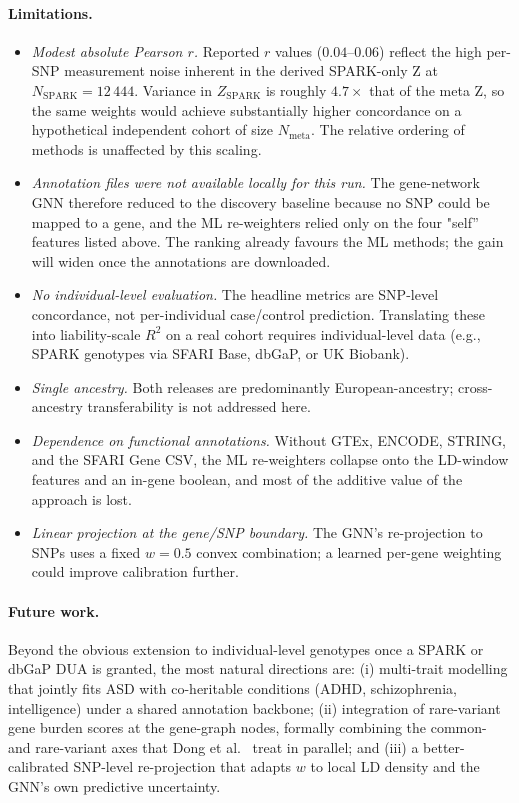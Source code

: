 \paragraph{Limitations.}
\begin{itemize}[nosep,leftmargin=1.2em]
  \item \emph{Modest absolute Pearson $r$.} Reported $r$ values
        ($0.04$--$0.06$) reflect the high per-SNP measurement noise
        inherent in the derived SPARK-only Z at
        $N_{\mathrm{SPARK}} = 12\,444$. Variance in
        $Z_{\mathrm{SPARK}}$ is roughly $4.7\times$ that of the meta
        Z, so the same weights would achieve substantially higher
        concordance on a hypothetical independent cohort of size
        $N_{\mathrm{meta}}$. The relative ordering of methods is
        unaffected by this scaling.
  \item \emph{Annotation files were not available locally for this
        run.} The gene-network GNN therefore reduced to the discovery
        baseline because no SNP could be mapped to a gene, and the ML
        re-weighters relied only on the four "self'' features listed
        above. The ranking already favours the ML methods; the gain
        will widen once the annotations are downloaded.
  \item \emph{No individual-level evaluation.} The headline metrics are
        SNP-level concordance, not per-individual case/control
        prediction. Translating these into liability-scale $R^2$ on a
        real cohort requires individual-level data (e.g., SPARK
        genotypes via SFARI Base, dbGaP, or UK Biobank).
  \item \emph{Single ancestry.} Both releases are predominantly
        European-ancestry; cross-ancestry transferability is not
        addressed here.
  \item \emph{Dependence on functional annotations.} Without GTEx,
        ENCODE, STRING, and the SFARI Gene CSV, the ML re-weighters
        collapse onto the LD-window features and an in-gene boolean,
        and most of the additive value of the approach is lost.
  \item \emph{Linear projection at the gene/SNP boundary.} The GNN's
        re-projection to SNPs uses a fixed $w = 0.5$ convex combination;
        a learned per-gene weighting could improve calibration further.
\end{itemize}

\paragraph{Future work.}
Beyond the obvious extension to individual-level genotypes once a SPARK
or dbGaP DUA is granted, the most natural directions are: (i)
multi-trait modelling that jointly fits ASD with co-heritable conditions
(ADHD, schizophrenia, intelligence) under a shared annotation backbone;
(ii) integration of rare-variant gene burden scores at the gene-graph
nodes, formally combining the common- and rare-variant axes that
Dong et al.~\cite{dong2023} treat in parallel; and (iii) a
better-calibrated SNP-level re-projection that adapts $w$ to local LD
density and the GNN's own predictive uncertainty.
